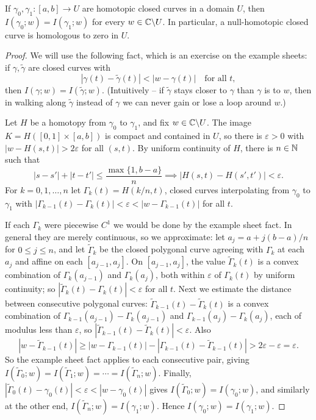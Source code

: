\documentclass[a4paper]{scrartcl}
\begin{document}
\begin{theorem}
    If $\gamma_0, \gamma_1: [a, b] \rightarrow U$ are homotopic closed curves in a domain $U$, then $I(\gamma_0; w) = I(\gamma_1; w)$ for every $w \in \mathbb{C} \backslash U$. In particular, a null-homotopic closed curve is homologous to zero in $U$.
\end{theorem}
\begin{proof}
    We will use the following fact, which is an exercise on the example sheets: if $\gamma, \tilde{\gamma}$ are closed curves with
    $$
    |\gamma(t) - \tilde{\gamma}(t)| < |w - \gamma(t)| \quad \text{for all } t,
    $$
    then $I(\gamma; w) = I(\tilde{\gamma}; w)$. (Intuitively -- if $\tilde\gamma$ stays closer to $\gamma$ than $\gamma$ is to $w$, then in walking along $\tilde{\gamma}$ instead of $\gamma$ we can never gain or lose a loop around $w$.)

    Let $H$ be a homotopy from $\gamma_0$ to $\gamma_1$, and fix $w \in \mathbb{C} \backslash U$. The image $K = H([0,1]\times[a,b])$ is compact and contained in $U$, so there is $\varepsilon > 0$ with $|w - H(s, t)| > 2\varepsilon$ for all $(s, t)$. By uniform continuity of $H$, there is $n \in \mathbb{N}$ such that
    $$
    |s - s'| + |t - t'| \leq \frac{\max\{1, b - a\}}{n} \implies |H(s, t) - H(s', t')| < \varepsilon.
    $$
    For $k = 0, 1, \dots, n$ let $\Gamma_k(t) = H(k/n, t)$, closed curves interpolating from $\gamma_0$ to $\gamma_1$ with $|\Gamma_{k - 1}(t) - \Gamma_k(t)| < \varepsilon < |w - \Gamma_{k-1}(t)|$ for all $t$.

    If each $\Gamma_k$ were piecewise $C^1$ we would be done by the example sheet fact. In general they are merely continuous, so we approximate: let $a_j = a + j(b - a)/n$ for $0 \leq j \leq n$, and let $\tilde{\Gamma}_k$ be the closed polygonal curve agreeing with $\Gamma_k$ at each $a_j$ and affine on each $[a_{j - 1}, a_j]$. On $[a_{j-1}, a_j]$, the value $\tilde{\Gamma}_k(t)$ is a convex combination of $\Gamma_k(a_{j - 1})$ and $\Gamma_k(a_j)$, both within $\varepsilon$ of $\Gamma_k(t)$ by uniform continuity; so $|\tilde{\Gamma}_k(t) - \Gamma_k(t)| < \varepsilon$ for all $t$. Next we estimate the distance between consecutive polygonal curves: $\tilde{\Gamma}_{k-1}(t) - \tilde{\Gamma}_k(t)$ is a convex combination of $\Gamma_{k-1}(a_{j-1}) - \Gamma_k(a_{j-1})$ and $\Gamma_{k-1}(a_j) - \Gamma_k(a_j)$, each of modulus less than $\varepsilon$, so $|\tilde{\Gamma}_{k-1}(t) - \tilde{\Gamma}_k(t)| < \varepsilon$. Also
    $$
    |w - \tilde{\Gamma}_{k - 1}(t)| \geq |w - \Gamma_{k - 1}(t)| - |\Gamma_{k-1}(t) - \tilde{\Gamma}_{k-1}(t)| > 2 \varepsilon - \varepsilon = \varepsilon.
    $$
    So the example sheet fact applies to each consecutive pair, giving $I(\tilde{\Gamma}_0; w) = I(\tilde{\Gamma}_1; w) = \cdots = I(\tilde{\Gamma}_n; w)$. Finally, $|\tilde{\Gamma}_0(t) - \gamma_0(t)| < \varepsilon < |w - \gamma_0(t)|$ gives $I(\tilde{\Gamma}_0; w) = I(\gamma_0; w)$, and similarly at the other end, $I(\tilde{\Gamma}_n; w) = I(\gamma_1; w)$. Hence $I(\gamma_0; w) = I(\gamma_1; w)$.


\end{proof}
\end{document}

